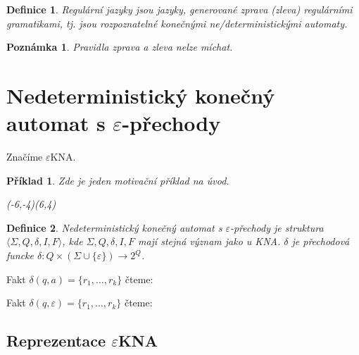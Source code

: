 \documentclass[10pt, a4paper, titlepage]{article}
\theoremstyle{note}
\newtheorem{definice}{\textbf{Definice}}
\newtheorem{priklad}{\textbf{Příklad}}
\newtheorem{poznamka}{\textbf{Poznámka}}
\newcommand{\ekna}{$\varepsilon$KNA} %
\begin{document}
\begin{definice}
Regulární jazyky jsou jazyky, generované zprava (zleva) regulárními gramatikami, tj. jsou rozpoznatelné konečnými ne/deterministickými automaty.
\end{definice}

\begin{poznamka}
Pravidla zprava a zleva nelze míchat.
\end{poznamka}

\section{Nedeterministický konečný automat s $\varepsilon$-přechody}
Značíme \ekna.
\begin{priklad}\label{priklad-5}
Zde je jeden motivační příklad na úvod.

\begin{center}
\begin{VCPicture}{(-6,-4)(6,4)}
\end{VCPicture}
\end{center}

\end{priklad}

\begin{definice}
Nedeterministický konečný automat s $\varepsilon$-přechody je struktura $ \langle \Sigma,Q,\delta,I,F \rangle $, kde $\Sigma,Q,\delta,I,F$ mají stejná význam jako u KNA. $\delta$ je přechodová funcke $\delta : Q \times (\Sigma \cup \lbrace \varepsilon \rbrace ) \rightarrow 2^Q$.
\end{definice}

Fakt $\delta (q,a) = \lbrace r_1,\ldots,r_k \rbrace $ čteme: 

Fakt $\delta (q,\varepsilon) = \lbrace r_1,\ldots,r_k \rbrace $ čteme: 

\subsection{Reprezentace \ekna}
\end{document}
